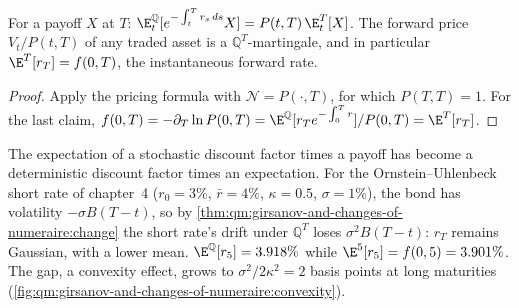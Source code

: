\begin{proposition}\label{prop:qm:girsanov-and-changes-of-numeraire:forward}
For a payoff $X$ at $T$: $\E^{\mathbb Q}_t[e^{-\int_t^Tr_s\,ds}X] = P(t, T)\,\E^{T}_t[X]$. The forward price
$V_t/P(t,T)$ of any traded asset is a $\mathbb Q^T$-martingale, and in particular $\E^T[r_T] = f(0, T)$,
the instantaneous forward rate.
\end{proposition}

\begin{proof}
Apply the pricing formula with $\mathcal N = P(\cdot, T)$, for which $P(T, T) = 1$. For the last claim,
$f(0,T) = -\partial_T\ln P(0,T) = \E^{\mathbb Q}[r_Te^{-\int_0^Tr}]/P(0,T) = \E^T[r_T]$.
\end{proof}

The expectation of a stochastic discount factor times a payoff has become a deterministic
discount factor times an expectation. For the Ornstein--Uhlenbeck short rate of chapter~4
($r_0 = 3\%$, $\bar r = 4\%$, $\kappa = 0.5$, $\sigma = 1\%$), the bond has volatility $-\sigma B(T - t)$, so by
\cref{thm:qm:girsanov-and-changes-of-numeraire:change} the short rate's drift under $\mathbb Q^T$ loses
$\sigma^2B(T - t)$: $r_T$ remains Gaussian, with a lower mean. $\E^{\mathbb Q}[r_5] = 3.918\%$ while $\E^5[r_5] = f(0,
5) = 3.901\%$. The gap, a convexity effect, grows to $\sigma^2/2\kappa^2 = 2$ basis points at long maturities
(\cref{fig:qm:girsanov-and-changes-of-numeraire:convexity}).

\begin{omfigure}

\label{fig:qm:girsanov-and-changes-of-numeraire:convexity}
\end{omfigure}

